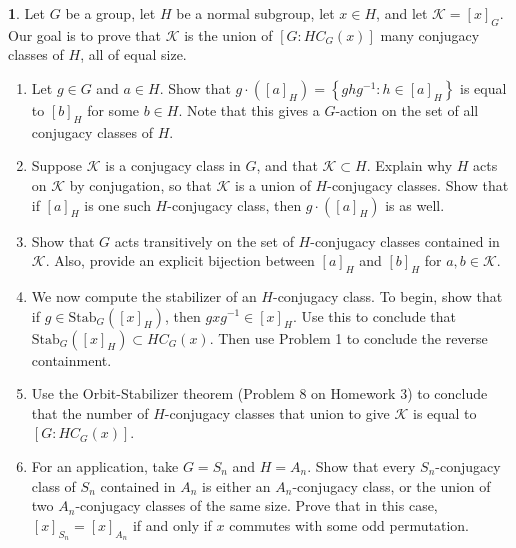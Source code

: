 \documentclass[12pt]{article}
\theoremstyle{definition}
\newtheorem{ex}{}
\begin{document}
\begin{ex}
	Let $G$ be a group, let $H$ be a normal subgroup, let $x \in H$, and let $\mathcal{K} = [x]_G$.
	Our goal is to prove that $\mathcal{K}$ is the union of $[G : HC_G(x)]$ many conjugacy classes of $H$, all of equal size.
	\begin{enumerate}[label=(\alph*)]
		\item Let $g \in G$ and $a \in H$.
		      Show that $g \cdot ([a]_H) = \left\lbrace ghg^{-1} : h \in [a]_H \right\rbrace$ is equal to $[b]_H$ for some $b \in H$.
		      Note that this gives a $G$-action on the set of all conjugacy classes of $H$.
		\item Suppose $\mathcal{K}$ is a conjugacy class in $G$, and that $\mathcal{K} \subset H$.
		      Explain why $H$ acts on $\mathcal{K}$ by conjugation, so that $\mathcal{K}$ is a union of $H$-conjugacy classes.
		      Show that if $[a]_H$ is one such $H$-conjugacy class, then $g \cdot ([a]_H)$ is as well.
		\item Show that $G$ acts transitively on the set of $H$-conjugacy classes contained in $\mathcal{K}$. Also, provide an explicit bijection between $[a]_H$ and $[b]_H$ for $a, b \in \mathcal{K}$.
		\item We now compute the stabilizer of an $H$-conjugacy class.
		      To begin, show that if $g \in \mathrm{Stab}_G([x]_H)$, then $gxg^{-1} \in [x]_H$.
		      Use this to conclude that $\mathrm{Stab}_G([x]_H) \subset HC_G(x)$.
		      Then use Problem 1 to conclude the reverse containment.
		\item Use the Orbit-Stabilizer theorem (Problem 8 on Homework 3) to conclude that the number of $H$-conjugacy classes that union to give $\mathcal{K}$ is equal to $[G : HC_G(x)]$.
		\item For an application, take $G = S_n$ and $H = A_n$.
		      Show that every $S_n$-conjugacy class of $S_n$ contained in $A_n$ is either an $A_n$-conjugacy class, or the union of two $A_n$-conjugacy classes of the same size.
		      Prove that in this case, $[x]_{S_n} = [x]_{A_n}$ if and only if $x$ commutes with some odd permutation.
	\end{enumerate}
\end{ex}
\end{document}
